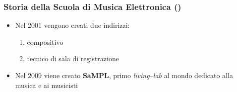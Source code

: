 \begin{frame}
    \frametitle<+->{Storia della Scuola di Musica Elettronica ()}

	\begin{itemize}

    \item Nel 2001 vengono creati due indirizzi:

      \begin{enumerate}

        \item compositivo

        \item tecnico di sala di registrazione

      \end{enumerate}

    \item Nel 2009 viene creato \textbf{SaMPL}, primo \emph{living--lab} al mondo
    dedicato alla musica e ai musicisti

	\end{itemize}

\end{frame}
